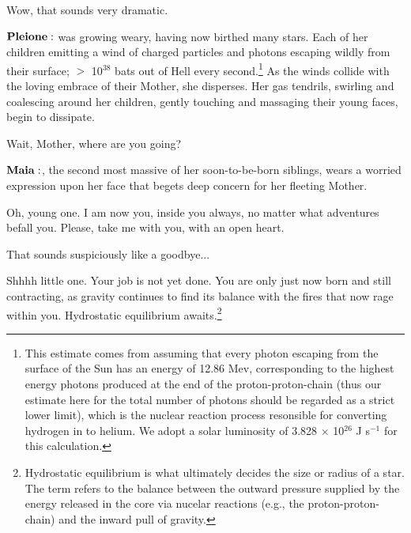\Maia Wow, that sounds very dramatic.

$\Pleione$ was growing weary, having now birthed many stars.  Each of her children emitting a wind of charged particles and photons escaping wildly from their surface; $>$ 10$^{38}$ bats out of Hell every second.\footnote{This estimate comes from assuming that every photon escaping from the surface of the Sun has an energy of 12.86 Mev, corresponding to the highest energy photons produced at the end of the proton-proton-chain (thus our estimate here for the total number of photons should be regarded as a strict lower limit), which is the nuclear reaction process resonsible for converting hydrogen in to helium.  We adopt a solar luminosity of 3.828 $\times$ 10$^{26}$ J s$^{-1}$ for this calculation.}  As the winds collide with the loving embrace of their Mother, she disperses.  Her gas tendrils, swirling and coalescing around her children, gently touching and massaging their young faces, begin to dissipate.

\Maia Wait, Mother, where are you going?  

$\Maia$, the second most massive of her soon-to-be-born siblings, wears a worried expression upon her face that begets deep concern for her fleeting Mother.  





\Pleione Oh, young one.  I am now you, inside you always, no matter what adventures befall you.  Please, take me with you, with an open heart.

\Maia That sounds suspiciously like a goodbye...

\Pleione Shhhh little one.  Your job is not yet done.  You are only just now born and still contracting, as gravity continues to find its balance with the fires that now rage within you.  Hydrostatic equilibrium awaits.\footnote{Hydrostatic equilibrium is what ultimately decides the size or radius of a star.  The term refers to the balance between the outward pressure supplied by the energy released in the core via nucelar reactions (e.g., the proton-proton-chain) and the inward pull of gravity.}

